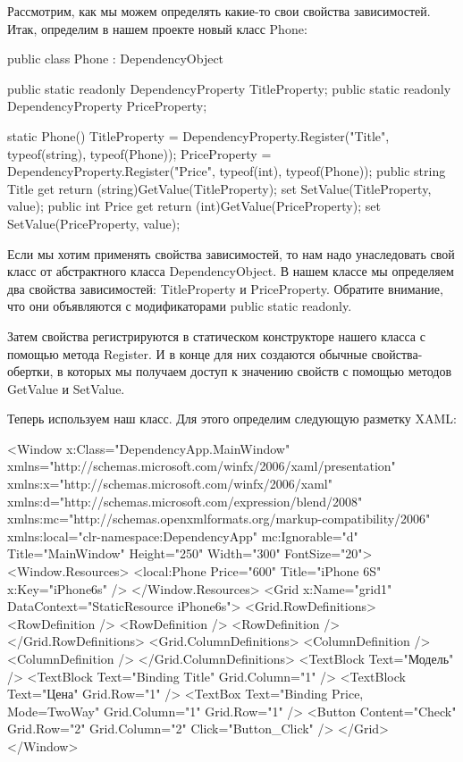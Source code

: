 Рассмотрим, как мы можем определять какие-то свои свойства зависимостей. Итак, определим в нашем проекте новый класс Phone:

public class Phone : DependencyObject
{
    public static readonly DependencyProperty TitleProperty;
    public static readonly DependencyProperty PriceProperty;
 
    static Phone()
    {
        TitleProperty = DependencyProperty.Register("Title", typeof(string), typeof(Phone));
        PriceProperty = DependencyProperty.Register("Price", typeof(int), typeof(Phone));
    }
    public string Title
    {
        get { return (string)GetValue(TitleProperty); }
        set { SetValue(TitleProperty, value); }
    }
    public int Price
    {
        get { return (int)GetValue(PriceProperty); }
        set { SetValue(PriceProperty, value); }
    }
}

Если мы хотим применять свойства зависимостей, то нам надо унаследовать свой класс от абстрактного класса DependencyObject. В нашем классе мы определяем два свойства зависимостей: TitleProperty и PriceProperty. Обратите внимание, что они объявляются с модификаторами public static readonly.

Затем свойства регистрируются в статическом конструкторе нашего класса с помощью метода Register. И в конце для них создаются обычные свойства-обертки, в которых мы получаем доступ к значению свойств с помощью методов GetValue и SetValue.

Теперь используем наш класс. Для этого определим следующую разметку XAML:

<Window x:Class="DependencyApp.MainWindow"
        xmlns="http://schemas.microsoft.com/winfx/2006/xaml/presentation"
        xmlns:x="http://schemas.microsoft.com/winfx/2006/xaml"
        xmlns:d="http://schemas.microsoft.com/expression/blend/2008"
        xmlns:mc="http://schemas.openxmlformats.org/markup-compatibility/2006"
        xmlns:local="clr-namespace:DependencyApp"
        mc:Ignorable="d"
        Title="MainWindow" Height="250" Width="300" FontSize="20">
    <Window.Resources>
        <local:Phone Price="600" Title="iPhone 6S" x:Key="iPhone6s" />
    </Window.Resources>
    <Grid x:Name="grid1" DataContext="{StaticResource iPhone6s}">
        <Grid.RowDefinitions>
            <RowDefinition />
            <RowDefinition />
            <RowDefinition />
        </Grid.RowDefinitions>
        <Grid.ColumnDefinitions>
            <ColumnDefinition />
            <ColumnDefinition />
        </Grid.ColumnDefinitions>
        <TextBlock Text="Модель" />
        <TextBlock Text="{Binding Title}" Grid.Column="1"  />
        <TextBlock Text="Цена" Grid.Row="1" />
        <TextBox Text="{Binding Price, Mode=TwoWay}" Grid.Column="1" Grid.Row="1"  />
        <Button Content="Check" Grid.Row="2" Grid.Column="2" Click="Button_Click" />
    </Grid>
</Window>

